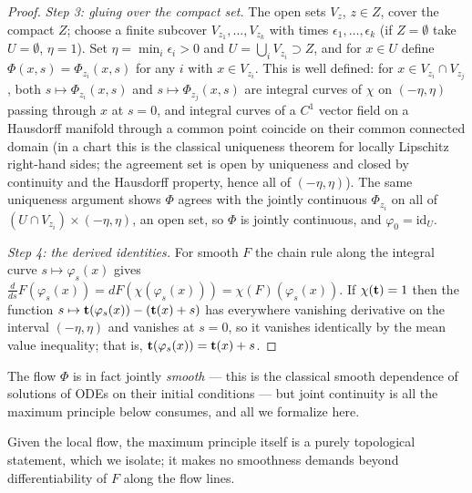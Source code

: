 \begin{proof}
{\em Step 3: gluing over the compact set.} The open sets $V_z$, $z\in Z$,
cover the compact $Z$; choose a finite subcover
$V_{z_1},\dots,V_{z_k}$ with times $\epsilon_1,\dots,\epsilon_k$ (if
$Z=\emptyset$ take $U=\emptyset$, $\eta=1$). Set
$\eta=\min_i\epsilon_i>0$ and $U=\bigcup_iV_{z_i}\supset Z$, and for
$x\in U$ define $\Phi(x,s)=\Phi_{z_i}(x,s)$ for any $i$ with $x\in
V_{z_i}$. This is well defined: for $x\in V_{z_i}\cap V_{z_j}$, both
$s\mapsto\Phi_{z_i}(x,s)$ and $s\mapsto\Phi_{z_j}(x,s)$ are integral
curves of $\chi$ on $(-\eta,\eta)$ passing through $x$ at $s=0$, and
integral curves of a $C^1$ vector field on a Hausdorff manifold through
a common point coincide on their common connected domain (in a chart
this is the classical uniqueness theorem for locally Lipschitz
right-hand sides; the agreement set is open by uniqueness and closed by
continuity and the Hausdorff property, hence all of $(-\eta,\eta)$). The
same uniqueness argument shows $\Phi$ agrees with the jointly continuous
$\Phi_{z_i}$ on all of $(U\cap V_{z_i})\times(-\eta,\eta)$, an open set,
so $\Phi$ is jointly continuous, and $\varphi_0=\mathrm{id}_U$.

{\em Step 4: the derived identities.} For smooth $F$ the chain rule
along the integral curve $s\mapsto\varphi_s(x)$ gives
$\frac{d}{ds}F(\varphi_s(x))=dF\left(\chi(\varphi_s(x))\right)
=\chi(F)(\varphi_s(x))$. If $\chi({\bf t})=1$ then the function
$s\mapsto{\bf t}(\varphi_s(x))-({\bf t}(x)+s)$ has everywhere vanishing
derivative on the interval $(-\eta,\eta)$ and vanishes at $s=0$, so it
vanishes identically by the mean value inequality; that is,
${\bf t}(\varphi_s(x))={\bf t}(x)+s$.
\end{proof}

The flow $\Phi$ is in fact jointly \emph{smooth} — this is the classical
smooth dependence of solutions of ODEs on their initial conditions — but
joint continuity is all the maximum principle below consumes, and all we
formalize here.

Given the local flow, the maximum principle itself is a purely
topological statement, which we isolate; it makes no smoothness
demands beyond differentiability of $F$ along the flow lines.

